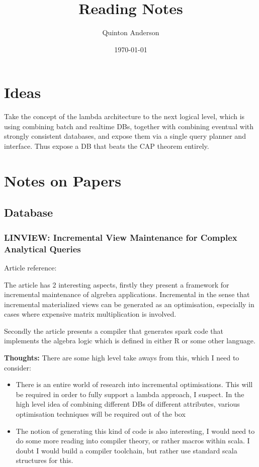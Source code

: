 \documentclass[11pt]{article}
\begin{document}
\title{Reading Notes}
\author{Quinton Anderson}
\date{\today}
\maketitle

\section{Ideas}

Take the concept of the lambda architecture to the next logical level, which is using combining batch and realtime DBs, together with combining eventual with strongly consistent databases, and expose them via a single query planner and interface. Thus expose a DB that beats the CAP theorem entirely. 



\section{Notes on Papers}

\subsection{Database}

\subsubsection{LINVIEW: Incremental View Maintenance for Complex Analytical
               Queries}

Article reference: \cite{DBLP:journals/corr/NikolicEK14}

The article has 2 interesting aspects, firstly they present a framework for incremental maintenance of algrebra applications. Incremental in the sense that incremental materialized views can be generated as an optimisation, especially in cases where expensive matrix multiplication is involved. 

Secondly the article presents a compiler that generates spark code that implements the algebra logic which is defined in either R or some other language. 

\textbf{Thoughts:} There are some high level take aways from this, which I need to consider:
\begin{itemize}
  \item There is an entire world of research into incremental optimisations. This will be required in order to fully support a lambda approach, I suspect. In the high level idea of combining different DBs of different attributes, various optimisation techniques will be required out of the box
  \item The notion of generating this kind of code is also interesting, I would need to do some more reading into compiler theory, or rather macros within scala. I doubt I would build a compiler toolchain, but rather use standard scala structures for this. 
\end{itemize}



\end{document}
